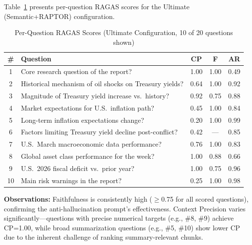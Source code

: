 \documentclass[11pt, a4paper]{article}
\begin{document}
Table~\ref{tab:ragas_full} presents per-question RAGAS scores for the Ultimate
(Semantic+RAPTOR) configuration.

\begin{table}[h!]
    \centering
    \footnotesize
    \begin{tabularx}{\textwidth}{|c|X|c|c|c|}
        \hline
        \# & \textbf{Question}                                      & \textbf{CP} & \textbf{F} & \textbf{AR} \\
        \hline
        1  & Core research question of the report?                  & 1.00        & 1.00       & 0.49        \\
        2  & Historical mechanism of oil shocks on Treasury yields? & 0.64        & 1.00       & 0.92        \\
        3  & Magnitude of Treasury yield increase vs.\ history?     & 0.92        & 0.75       & 0.88        \\
        4  & Market expectations for U.S.\ inflation path?          & 0.45        & 1.00       & 0.84        \\
        5  & Long-term inflation expectations change?               & 0.20        & 1.00       & 0.99        \\
        6  & Factors limiting Treasury yield decline post-conflict? & 0.42        & ---        & 0.85        \\
        7  & U.S.\ March macroeconomic data performance?            & 0.76        & 1.00       & 0.83        \\
        8  & Global asset class performance for the week?           & 1.00        & 0.88       & 0.66        \\
        9  & U.S.\ 2026 fiscal deficit vs.\ prior year?             & 1.00        & 0.75       & 0.96        \\
        10 & Main risk warnings in the report?                      & 0.25        & 1.00       & 0.98        \\
        \hline
    \end{tabularx}
    \caption{Per-Question RAGAS Scores (Ultimate Configuration, 10 of 20 questions shown)}
    \label{tab:ragas_full}
\end{table}

\noindent\textbf{Observations:} Faithfulness is consistently high ($\geq$0.75 for all scored questions), confirming the anti-hallucination prompt's effectiveness. Context Precision varies significantly---questions with precise numerical targets (e.g., \#8, \#9) achieve CP=1.00, while broad summarization questions (e.g., \#5, \#10) show lower CP due to the inherent challenge of ranking summary-relevant chunks.
\end{document}
